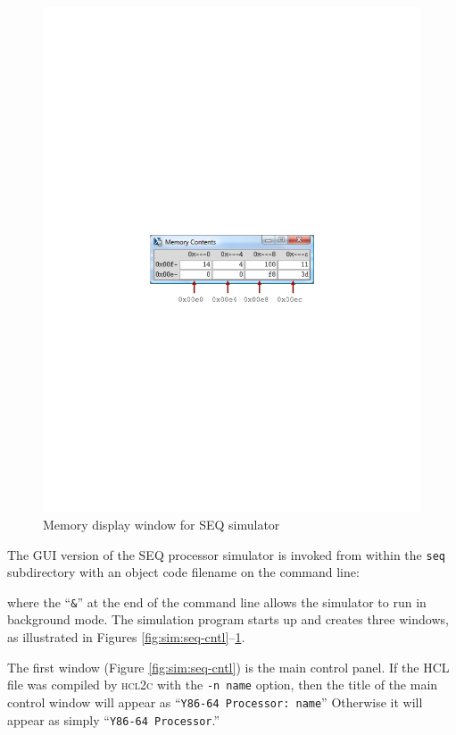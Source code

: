 \documentclass[11pt]{article}
\begin{document}
\begin{figure}
\centerline{\includegraphics*[scale=1.0]{seq-mem}}
\caption{Memory display window for SEQ simulator}
\label{fig:sim:seq-mem}
\end{figure}

The GUI version of the SEQ processor simulator is invoked from within the \texttt{seq} subdirectory with 
an object code filename on the command line:
\begin{tty}
\end{tty}
where the ``\texttt{\&}'' at the end of the command line allows the
simulator to run in background mode.  The simulation program starts up
and creates three windows, as illustrated in Figures
\ref{fig:sim:seq-cntl}--\ref{fig:sim:seq-mem}.

The first window (Figure \ref{fig:sim:seq-cntl}) is the main control
panel. If the HCL file was compiled by \textsc{hcl2c} with the
\texttt{-n name} option, then the title of the main control window will appear
as ``\texttt{Y86-64 Processor: name}''
Otherwise it will appear as simply
``\texttt{Y86-64 Processor}.''
\end{document}
